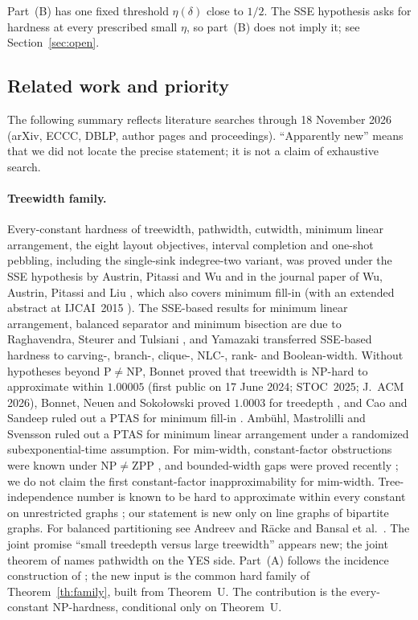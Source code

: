 \documentclass[11pt,letterpaper]{article}
\theoremstyle{definition}
\theoremstyle{remark}
\begin{document}
Part~(B) has one fixed threshold \(\eta(\delta)\) close to \(1/2\). The SSE
hypothesis asks for hardness at every prescribed small \(\eta\), so part~(B)
does not imply it; see Section~\ref{sec:open}.

\subsection{Related work and priority}

The following summary reflects literature searches through 18 November 2026
(arXiv, ECCC, DBLP, author pages and proceedings). ``Apparently new'' means
that we did not locate the precise statement; it is not a claim of
exhaustive search.

\paragraph{Treewidth family.}
Every-constant hardness of treewidth, pathwidth, cutwidth, minimum linear
arrangement, the eight layout objectives, interval completion and one-shot
pebbling, including the single-sink indegree-two variant, was proved under
the SSE hypothesis by Austrin, Pitassi and Wu \cite{apw12} and in the journal
paper of Wu, Austrin, Pitassi and Liu \cite{wapl14}, which also covers
minimum fill-in (with an extended abstract at IJCAI~2015 \cite{wapl15}). The
SSE-based results for minimum linear arrangement, balanced separator and
minimum bisection are due to Raghavendra, Steurer and Tulsiani \cite{rst12},
and Yamazaki \cite{yam18} transferred SSE-based hardness to carving-,
branch-, clique-, NLC-, rank- and Boolean-width. Without hypotheses beyond
\(\mathrm P\ne\mathrm{NP}\), Bonnet proved that treewidth is NP-hard to
approximate within \(1.00005\) \cite{bon} (first public on 17 June 2024;
STOC~2025; J.~ACM 2026), Bonnet, Neuen and Soko\l{}owski proved \(1.0003\)
for treedepth \cite{bns25}, and Cao and Sandeep ruled out a PTAS for minimum
fill-in \cite{cs17}. Ambühl, Mastrolilli and Svensson \cite{ams11} ruled out
a PTAS for minimum linear arrangement under a randomized subexponential-time
assumption. For mim-width, constant-factor obstructions were known under
\(\mathrm{NP}\ne\mathrm{ZPP}\) \cite{sv16}, and bounded-width gaps were
proved recently \cite{icalp25,icalp26}; we do not claim the first
constant-factor inapproximability for mim-width. Tree-independence number is
known to be hard to approximate within every constant on unrestricted graphs
\cite{dms21,dfgkm22,zuc07}; our statement is new only on line graphs of
bipartite graphs. For balanced partitioning see Andreev and R\"acke
\cite{ar06} and Bansal et al.\ \cite{bfk14}. The joint promise
``small treedepth versus large treewidth'' appears new; the joint theorem of
\cite{wapl14} names pathwidth on the YES side. Part~(A) follows the
incidence construction of \cite{apw12,wapl14}; the new input is the common
hard family of Theorem~\ref{th:family}, built from Theorem~U. The
contribution is the every-constant NP-hardness, conditional only on
Theorem~U.
\end{document}
